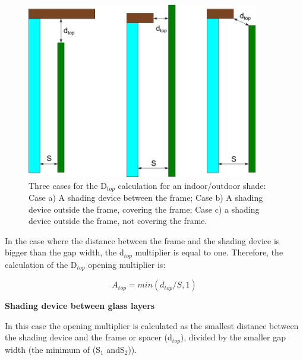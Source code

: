 \begin{figure}[htbp]
\centering
\includegraphics[width=0.9\textwidth, height=0.9\textheight, keepaspectratio=true]{media/three-cases-for-the-dtop-calculation-for-an-indoor-outdoor-shade-collage.png}
\caption{Three cases for the D\(_{top}\) calculation for an indoor/outdoor shade: Case a) A shading device between the frame; Case b) A shading device outside the frame, covering the frame; Case c) a shading device outside the frame, not covering the frame. \protect \label{fig:three-cases-for-the-dp-calculation-for-an-indoor-outdoor-shade}}
\end{figure}

In the case where the distance between the frame and the shading device is bigger than the gap width, the d\(_{top}\) multiplier is equal to one. Therefore, the calculation of the D\(_{top}\) opening multiplier is:

\begin{equation*}
A_{top} = min(d_{top}/S, 1)
\end{equation*}

\textbf{Shading device between glass layers}

In this case the opening multiplier is calculated as the smallest distance between the shading device and the frame or spacer (d\(_{top}\)), divided by the smaller gap width (the minimum of (S\(_{1}\) andS\(_{2}\))).

